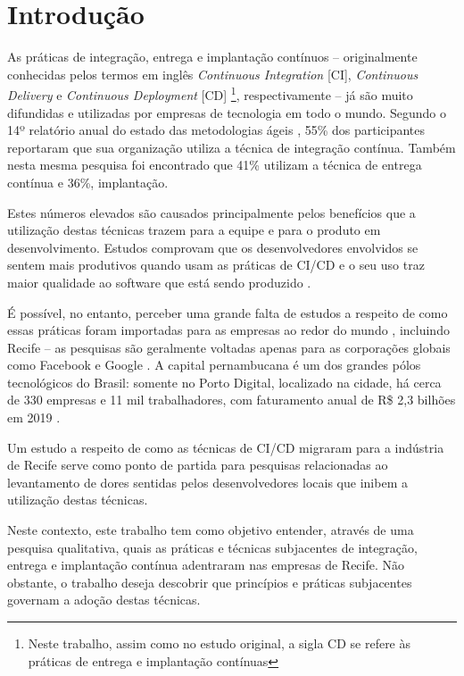 
\section{Introdução}

As práticas de integração, entrega e implantação contínuos \cite{fowlerCI, fowlerCD} -- originalmente conhecidas pelos termos em inglês \emph{Continuous Integration} [CI], \emph{Continuous Delivery} e \emph{Continuous Deployment} [CD] \footnote{Neste trabalho, assim como no estudo original, a sigla CD se refere às práticas de entrega e implantação contínuas}, respectivamente -- já são muito difundidas e utilizadas por empresas de tecnologia em todo o mundo. Segundo o 14º relatório anual do estado das metodologias ágeis \cite{stateAgileReport2020}, 55\% dos participantes reportaram que sua organização utiliza a técnica de integração contínua. Também nesta mesma pesquisa foi encontrado que 41\% utilizam a técnica de entrega contínua e 36\%, implantação.

Estes números elevados são causados principalmente pelos benefícios que a utilização destas técnicas trazem para a equipe e para o produto em desenvolvimento. Estudos comprovam que os desenvolvedores envolvidos se sentem mais produtivos quando usam as práticas de CI/CD \cite{hilton2016} e o seu uso traz maior qualidade ao software que está sendo produzido \cite{savor2015}. 

É possível, no entanto, perceber uma grande falta de estudos a respeito de como essas práticas foram importadas para as empresas ao redor do mundo \cite{empiricalStudy2016}, incluindo Recife -- as pesquisas são geralmente voltadas apenas para as corporações globais como Facebook \cite{savor2015} e Google \cite{googleCi}. A capital pernambucana é um dos grandes pólos tecnológicos do Brasil: somente no Porto Digital, localizado na cidade, há cerca de 330 empresas e 11 mil trabalhadores, com faturamento anual de R\$ 2,3 bilhões em 2019 \cite{portoDigital}.

Um estudo a respeito de como as técnicas de CI/CD migraram para a indústria de Recife serve como ponto de partida para pesquisas relacionadas ao levantamento de dores sentidas pelos desenvolvedores locais que inibem a utilização destas técnicas.

Neste contexto, este trabalho tem como objetivo entender, através de uma pesquisa qualitativa, quais as práticas e técnicas subjacentes de integração, entrega e implantação contínua adentraram nas empresas de Recife. Não obstante, o trabalho deseja descobrir que princípios e práticas subjacentes governam a adoção destas técnicas.
